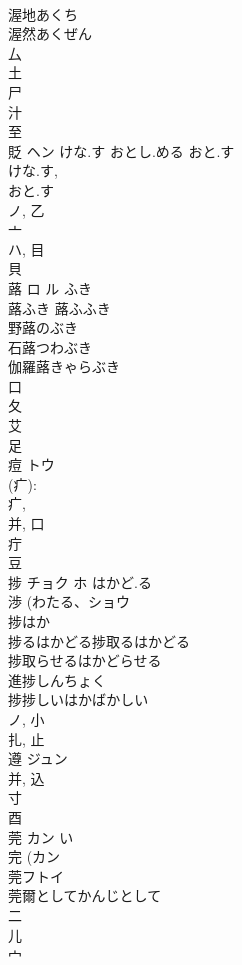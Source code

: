 \documentclass[8pt]{extreport}
\begin{document}
\begin{CJK}{UTF8}{min}
\\	渥地あくち 
\\	渥然あくぜん 
\\	厶 
\\	土 
\\	尸 
\\	汁 
\\	至 
\\	貶	ヘン	けな.す おとし.める おと.す	
\\	けな.す, 
\\	おと.す 
\\	ノ, 乙 
\\	亠 
\\	ハ, 目 
\\	貝 
\\	蕗	ロ ル	ふき	
\\	蕗ふき 蕗ふふき 
\\	野蕗のぶき 
\\	石蕗つわぶき 
\\	伽羅蕗きゃらぶき 
\\	口 
\\	夂 
\\	艾 
\\	足 
\\	痘	トウ		
\\	(疒): 
\\	疒, 
\\	并, 口 
\\	疔 
\\	豆 
\\	捗	チョク ホ	はかど.る	
\\	渉 (わたる、ショウ 
\\	捗はか
\\	捗るはかどる捗取るはかどる
\\	捗取らせるはかどらせる
\\	進捗しんちょく
\\	捗捗しいはかばかしい
\\	ノ, 小 
\\	扎, 止 
\\	遵	ジュン		
\\	并, 込 
\\	寸 
\\	酉 
\\	莞	カン	い	
\\	完 (カン 
\\	莞フトイ
\\	莞爾としてかんじとして
\\	二 
\\	儿 
\\	宀 

\end{CJK}
\end{document}

